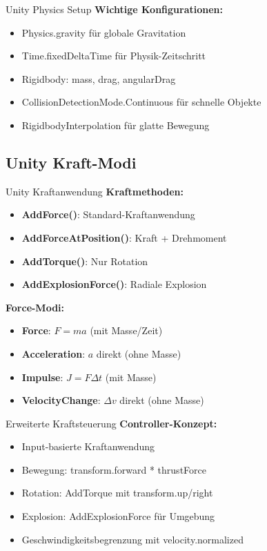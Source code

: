 \begin{concept}{Unity Physics Setup}
    \textbf{Wichtige Konfigurationen:}
    \begin{itemize}
        \item Physics.gravity für globale Gravitation
        \item Time.fixedDeltaTime für Physik-Zeitschritt
        \item Rigidbody: mass, drag, angularDrag
        \item CollisionDetectionMode.Continuous für schnelle Objekte
        \item RigidbodyInterpolation für glatte Bewegung
    \end{itemize}
\end{concept}

\subsection{Unity Kraft-Modi}

\begin{definition}{Unity Kraftanwendung}
    \textbf{Kraftmethoden:}
    \begin{itemize}
        \item \textbf{AddForce()}: Standard-Kraftanwendung
        \item \textbf{AddForceAtPosition()}: Kraft + Drehmoment
        \item \textbf{AddTorque()}: Nur Rotation
        \item \textbf{AddExplosionForce()}: Radiale Explosion
    \end{itemize}
    
    \textbf{Force-Modi:}
    \begin{itemize}
        \item \textbf{Force}: $F = ma$ (mit Masse/Zeit)
        \item \textbf{Acceleration}: $a$ direkt (ohne Masse)
        \item \textbf{Impulse}: $J = F\Delta t$ (mit Masse)
        \item \textbf{VelocityChange}: $\Delta v$ direkt (ohne Masse)
    \end{itemize}
\end{definition}

\begin{concept}{Erweiterte Kraftsteuerung}
    \textbf{Controller-Konzept:}
    \begin{itemize}
        \item Input-basierte Kraftanwendung
        \item Bewegung: transform.forward * thrustForce
        \item Rotation: AddTorque mit transform.up/right
        \item Explosion: AddExplosionForce für Umgebung
        \item Geschwindigkeitsbegrenzung mit velocity.normalized
    \end{itemize}
\end{concept}

